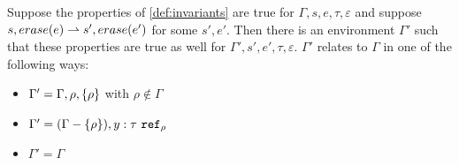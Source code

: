 \documentclass[a4paper]{article}
\begin{document}
\begin{thm}
  \label{thm:subred}
  Suppose the properties of \ref{def:invariants} are true for $\Gamma,s,e,\tau,\varepsilon$ and
  suppose $s,erase(e) \rightharpoonup  s',erase(e')$ for some $s',e'$. Then there is
  an environment $\Gamma'$ such that these properties are true as well for
  $\Gamma',s',e',\tau,\varepsilon$. $\Gamma'$ relates to $\Gamma$ in one of the following ways:
  \begin{itemize}
    \item $\Gamma' = \Gamma, \rho,\left\{ \rho \right\}$ with $\rho\notin \Gamma$
    \item $\Gamma' = (\Gamma - \left\{ \rho \right\}), y : {\normalfont \tau\ \texttt{ref}_{\rho}}$
    \item $\Gamma' = \Gamma$ 
  \end{itemize}
\end{thm}
\end{document}

